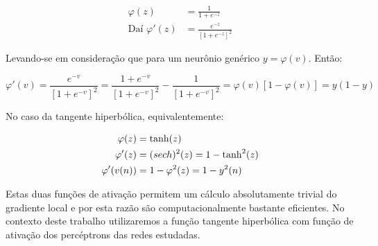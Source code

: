 \begin{align}
\varphi(z) &= \frac{1}{1 + e^{-z}} \\
\text{Daí } \varphi'(z) &= \frac{e^{-z}}{[1+e^{-z}]^2}
\end{align}

Levando-se em consideração que para um neurônio genérico $y =
\varphi(v)$. Então:

\begin{equation}
\varphi'(v) = \frac{e^{-v}}{[1+e^{-v}]^2} = \frac{1+e^{-v}}{[1+e^{-v}]^2} -
\frac{1}{[1+e^{-v}]^2} = \varphi(v)[1 - \varphi(v)] = y(1-y)
\end{equation}

No caso da tangente hiperbólica, equivalentemente:

\begin{align}
\varphi(z) &= \tanh(z) \\
\varphi'(z) &= \text(sech)^2(z) = 1 - \tanh^2(z) \\
\varphi'(v(n)) &= 1 - \varphi^2(z) = 1-y^2(n)
\end{align}

Estas duas funções de ativação permitem um cálculo absolutamente trivial do
gradiente local e por esta razão são computacionalmente bastante
eficientes. No contexto deste trabalho utilizaremos a função tangente
hiperbólica com função de ativação dos percéptrons das redes estudadas.

